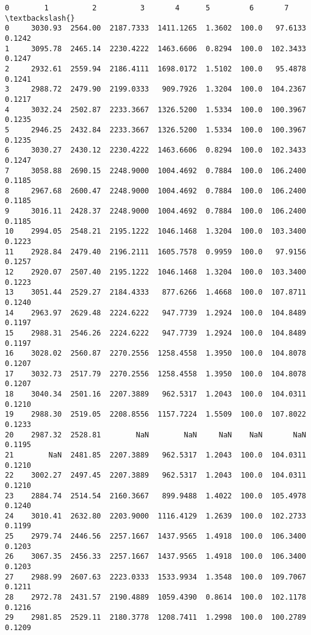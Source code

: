 \documentclass[11pt]{article}
\begin{document}
    \begin{Verbatim}[commandchars=\\\{\}]
          0        1          2          3       4      5         6       7    \textbackslash{}
0     3030.93  2564.00  2187.7333  1411.1265  1.3602  100.0   97.6133  0.1242   
1     3095.78  2465.14  2230.4222  1463.6606  0.8294  100.0  102.3433  0.1247   
2     2932.61  2559.94  2186.4111  1698.0172  1.5102  100.0   95.4878  0.1241   
3     2988.72  2479.90  2199.0333   909.7926  1.3204  100.0  104.2367  0.1217   
4     3032.24  2502.87  2233.3667  1326.5200  1.5334  100.0  100.3967  0.1235   
5     2946.25  2432.84  2233.3667  1326.5200  1.5334  100.0  100.3967  0.1235   
6     3030.27  2430.12  2230.4222  1463.6606  0.8294  100.0  102.3433  0.1247   
7     3058.88  2690.15  2248.9000  1004.4692  0.7884  100.0  106.2400  0.1185   
8     2967.68  2600.47  2248.9000  1004.4692  0.7884  100.0  106.2400  0.1185   
9     3016.11  2428.37  2248.9000  1004.4692  0.7884  100.0  106.2400  0.1185   
10    2994.05  2548.21  2195.1222  1046.1468  1.3204  100.0  103.3400  0.1223   
11    2928.84  2479.40  2196.2111  1605.7578  0.9959  100.0   97.9156  0.1257   
12    2920.07  2507.40  2195.1222  1046.1468  1.3204  100.0  103.3400  0.1223   
13    3051.44  2529.27  2184.4333   877.6266  1.4668  100.0  107.8711  0.1240   
14    2963.97  2629.48  2224.6222   947.7739  1.2924  100.0  104.8489  0.1197   
15    2988.31  2546.26  2224.6222   947.7739  1.2924  100.0  104.8489  0.1197   
16    3028.02  2560.87  2270.2556  1258.4558  1.3950  100.0  104.8078  0.1207   
17    3032.73  2517.79  2270.2556  1258.4558  1.3950  100.0  104.8078  0.1207   
18    3040.34  2501.16  2207.3889   962.5317  1.2043  100.0  104.0311  0.1210   
19    2988.30  2519.05  2208.8556  1157.7224  1.5509  100.0  107.8022  0.1233   
20    2987.32  2528.81        NaN        NaN     NaN    NaN       NaN  0.1195   
21        NaN  2481.85  2207.3889   962.5317  1.2043  100.0  104.0311  0.1210   
22    3002.27  2497.45  2207.3889   962.5317  1.2043  100.0  104.0311  0.1210   
23    2884.74  2514.54  2160.3667   899.9488  1.4022  100.0  105.4978  0.1240   
24    3010.41  2632.80  2203.9000  1116.4129  1.2639  100.0  102.2733  0.1199   
25    2979.74  2446.56  2257.1667  1437.9565  1.4918  100.0  106.3400  0.1203   
26    3067.35  2456.33  2257.1667  1437.9565  1.4918  100.0  106.3400  0.1203   
27    2988.99  2607.63  2223.0333  1533.9934  1.3548  100.0  109.7067  0.1211   
28    2972.78  2431.57  2190.4889  1059.4390  0.8614  100.0  102.1178  0.1216   
29    2981.85  2529.11  2180.3778  1208.7411  1.2998  100.0  100.2789  0.1209   

\end{Verbatim}
\end{document}
